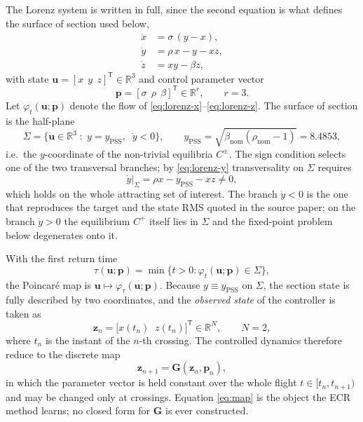 The Lorenz system is written in full, since the second equation is what defines
the surface of section used below,
%
\begin{align}
\dot{x} &= \sigma\,(y-x), \label{eq:lorenz-x}\\
\dot{y} &= \rho\,x - y - x z, \label{eq:lorenz-y}\\
\dot{z} &= x y - \beta z, \label{eq:lorenz-z}
\end{align}
%
with state $\mathbf{u}=[x\;\,y\;\,z]^{\mathsf T}\in\mathbb{R}^{3}$ and control
parameter vector
%
\begin{equation}
\mathbf{p}=[\sigma\;\,\rho\;\,\beta]^{\mathsf T}\in\mathbb{R}^{r},
\qquad r=3 .
\label{eq:param-vector}
\end{equation}
%
Let $\varphi_t(\mathbf{u};\mathbf{p})$ denote the flow of
\eqref{eq:lorenz-x}--\eqref{eq:lorenz-z}. The surface of section is the
half-plane
%
\begin{equation}
\Sigma=\bigl\{\mathbf{u}\in\mathbb{R}^{3}\;:\;y=y_{\mathrm{PSS}},\;\;\dot y<0\bigr\},
\qquad
y_{\mathrm{PSS}}=\sqrt{\beta_{\mathrm{nom}}(\rho_{\mathrm{nom}}-1)}=8.4853 ,
\label{eq:section}
\end{equation}
%
i.e.\ the $y$-coordinate of the non-trivial equilibria $C^{\pm}$. The sign
condition selects one of the two transversal branches; by \eqref{eq:lorenz-y}
transversality on $\Sigma$ requires
%
\begin{equation}
\dot y\big|_{\Sigma}=\rho x - y_{\mathrm{PSS}} - x z \neq 0 ,
\label{eq:transversality}
\end{equation}
%
which holds on the whole attracting set of interest. The branch $\dot y<0$ is
the one that reproduces the target and the state RMS quoted in the source
paper; on the branch $\dot y>0$ the equilibrium $C^{+}$ itself lies in $\Sigma$
and the fixed-point problem below degenerates onto it.

With the first return time
%
\begin{equation}
\tau(\mathbf{u};\mathbf{p})=\min\bigl\{t>0:\varphi_t(\mathbf{u};\mathbf{p})\in\Sigma\bigr\},
\label{eq:return-time}
\end{equation}
%
the Poincar\'e map is $\mathbf{u}\mapsto\varphi_{\tau}(\mathbf{u};\mathbf{p})$.
Because $y\equiv y_{\mathrm{PSS}}$ on $\Sigma$, the section state is fully
described by two coordinates, and the \emph{observed state} of the controller
is taken as
%
\begin{equation}
\mathbf{z}_n=\bigl[x(t_n)\;\;z(t_n)\bigr]^{\mathsf T}\in\mathbb{R}^{N},
\qquad N=2,
\label{eq:observed-state}
\end{equation}
%
where $t_n$ is the instant of the $n$-th crossing. The controlled dynamics
therefore reduce to the discrete map
%
\begin{equation}
\mathbf{z}_{n+1}=\mathbf{G}(\mathbf{z}_n,\mathbf{p}_n),
\label{eq:map}
\end{equation}
%
in which the parameter vector is held constant over the whole flight
$t\in[t_n,t_{n+1})$ and may be changed only at crossings. Equation
\eqref{eq:map} is the object the ECR method learns; no closed form for
$\mathbf{G}$ is ever constructed.

